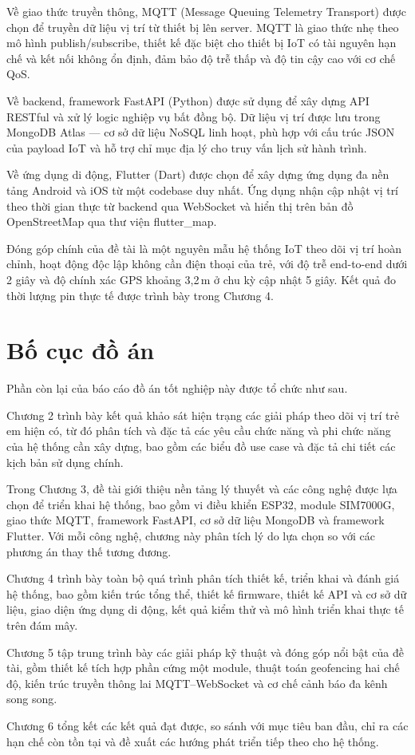 \documentclass[../DoAn.tex]{subfiles}
\begin{document}
Về giao thức truyền thông, MQTT (Message Queuing Telemetry Transport) được chọn để truyền dữ liệu vị trí từ thiết bị lên server. MQTT là giao thức nhẹ theo mô hình publish/subscribe, thiết kế đặc biệt cho thiết bị IoT có tài nguyên hạn chế và kết nối không ổn định, đảm bảo độ trễ thấp và độ tin cậy cao với cơ chế QoS.

Về backend, framework FastAPI (Python) được sử dụng để xây dựng API RESTful và xử lý logic nghiệp vụ bất đồng bộ. Dữ liệu vị trí được lưu trong MongoDB Atlas — cơ sở dữ liệu NoSQL linh hoạt, phù hợp với cấu trúc JSON của payload IoT và hỗ trợ chỉ mục địa lý cho truy vấn lịch sử hành trình.

Về ứng dụng di động, Flutter (Dart) được chọn để xây dựng ứng dụng đa nền tảng Android và iOS từ một codebase duy nhất. Ứng dụng nhận cập nhật vị trí theo thời gian thực từ backend qua WebSocket và hiển thị trên bản đồ OpenStreetMap qua thư viện flutter\_map.

Đóng góp chính của đề tài là một nguyên mẫu hệ thống IoT theo dõi vị trí hoàn chỉnh, hoạt động độc lập không cần điện thoại của trẻ, với độ trễ end-to-end dưới 2 giây và độ chính xác GPS khoảng 3{,}2\,m ở chu kỳ cập nhật 5 giây. Kết quả đo thời lượng pin thực tế được trình bày trong Chương 4.

\section{Bố cục đồ án}
\label{section:1.4}

Phần còn lại của báo cáo đồ án tốt nghiệp này được tổ chức như sau.

Chương 2 trình bày kết quả khảo sát hiện trạng các giải pháp theo dõi vị trí trẻ em hiện có, từ đó phân tích và đặc tả các yêu cầu chức năng và phi chức năng của hệ thống cần xây dựng, bao gồm các biểu đồ use case và đặc tả chi tiết các kịch bản sử dụng chính.

Trong Chương 3, đề tài giới thiệu nền tảng lý thuyết và các công nghệ được lựa chọn để triển khai hệ thống, bao gồm vi điều khiển ESP32, module SIM7000G, giao thức MQTT, framework FastAPI, cơ sở dữ liệu MongoDB và framework Flutter. Với mỗi công nghệ, chương này phân tích lý do lựa chọn so với các phương án thay thế tương đương.

Chương 4 trình bày toàn bộ quá trình phân tích thiết kế, triển khai và đánh giá hệ thống, bao gồm kiến trúc tổng thể, thiết kế firmware, thiết kế API và cơ sở dữ liệu, giao diện ứng dụng di động, kết quả kiểm thử và mô hình triển khai thực tế trên đám mây.

Chương 5 tập trung trình bày các giải pháp kỹ thuật và đóng góp nổi bật của đề tài, gồm thiết kế tích hợp phần cứng một module, thuật toán geofencing hai chế độ, kiến trúc truyền thông lai MQTT–WebSocket và cơ chế cảnh báo đa kênh song song.

Chương 6 tổng kết các kết quả đạt được, so sánh với mục tiêu ban đầu, chỉ ra các hạn chế còn tồn tại và đề xuất các hướng phát triển tiếp theo cho hệ thống.
\end{document}
